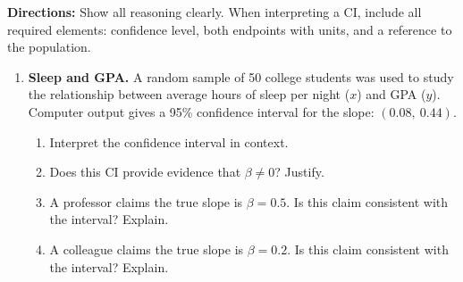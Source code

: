 \documentclass[10pt]{article}
\begin{document}
\namedateperiod

\vspace{0.1in}
\textbf{Directions:} Show all reasoning clearly. When interpreting a CI, include all
required elements: confidence level, both endpoints with units, and a reference to the
population.

\begin{enumerate}

  \item \textbf{Sleep and GPA.} A random sample of 50 college students was used to study
        the relationship between average hours of sleep per night ($x$) and GPA ($y$).
        Computer output gives a 95\% confidence interval for the slope: $(0.08,\ 0.44)$.

        \begin{enumerate}[label=\alph*.]

          \item Interpret the confidence interval in context.


          \item Does this CI provide evidence that $\beta \ne 0$? Justify.


          \item A professor claims the true slope is $\beta = 0.5$.
                Is this claim consistent with the interval? Explain.


          \item A colleague claims the true slope is $\beta = 0.2$.
                Is this claim consistent with the interval? Explain.



\end{enumerate}
\end{enumerate}
\end{document}
